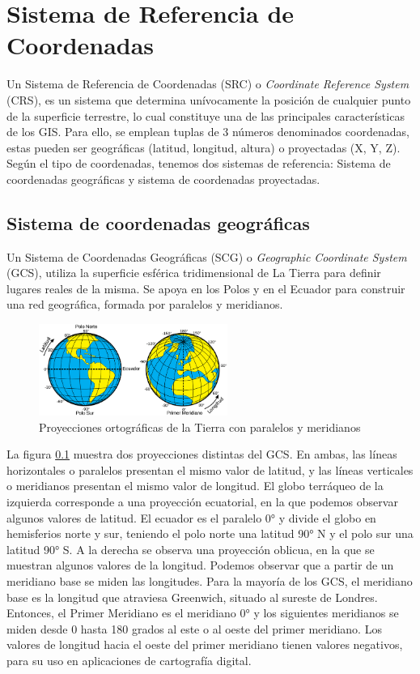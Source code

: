 \chapter*{Sistema de Referencia de Coordenadas}
\setcounter{chapter}{3} 
\setcounter{section}{0}

Un Sistema de Referencia de Coordenadas (SRC) o \textit{Coordinate Reference System} (CRS), es un sistema que determina unívocamente la posición de cualquier punto de la superficie terrestre, 
lo cual constituye una de las principales características de los GIS.
Para ello, se emplean tuplas de 3 números denominados coordenadas, estas pueden ser geográficas (latitud, longitud, altura) o proyectadas (X, Y, Z).
Según el tipo de coordenadas, tenemos dos sistemas de referencia: Sistema de coordenadas geográficas y sistema de coordenadas proyectadas.

\section{Sistema de coordenadas geográficas}
Un Sistema de Coordenadas Geográficas (SCG) o \textit{Geographic Coordinate System} (GCS), utiliza la superficie esférica tridimensional de La Tierra para definir lugares reales de la misma.
Se apoya en los Polos y en el Ecuador para construir una red geográfica, formada por paralelos y meridianos.

\begin{figure}[H]
  \centering
  \includegraphics[width=0.55\textwidth]{Imagenes/CRS/GCS.png}
  \caption{Proyecciones ortográficas de la Tierra con paralelos y meridianos} \label{fig:GCS}
\end{figure}

La figura \ref{fig:GCS} muestra dos proyecciones distintas del GCS. 
En ambas, las líneas horizontales o paralelos presentan el mismo valor de latitud, y las líneas verticales o meridianos presentan el mismo valor de longitud. 
El globo terráqueo de la izquierda corresponde a una proyección ecuatorial, en la que podemos observar algunos valores de latitud. 
El ecuador es el paralelo 0° y divide el globo en hemisferios norte y sur, teniendo el polo norte una latitud 90° N y el polo sur una latitud 90° S.
A la derecha se observa una proyección oblicua, en la que se muestran algunos valores de la longitud. Podemos observar que a partir de un meridiano base se miden las longitudes.
Para la mayoría de los GCS, el meridiano base es la longitud que atraviesa Greenwich, situado al sureste de Londres. 
Entonces, el Primer Meridiano es el meridiano 0° y los siguientes meridianos se miden desde 0 hasta 180 grados al este o al oeste del primer meridiano.
Los valores de longitud hacia el oeste del primer meridiano tienen valores negativos, para su uso en aplicaciones de cartografía digital.

